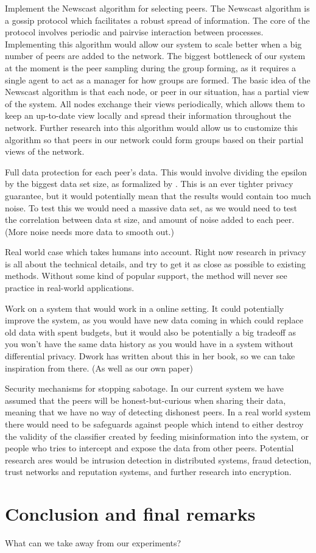 Implement the Newscast algorithm for selecting peers. The Newscast algorithm is a gossip protocol which facilitates a robust spread of information. The core of the protocol involves periodic and pairvise interaction between processes. Implementing this algorithm would allow our system to scale better when a big number of peers are added to the network. The biggest bottleneck of our system at the moment is the peer sampling during the group forming, as it requires a single agent to act as a manager for how groups are formed. The basic idea of the Newscast algorithm is that each node, or peer in our situation, has a partial view of the system. All nodes exchange their views periodically, which allows them to keep an up-to-date view locally and spread their information throughout the network. Further research into this algorithm would allow us to customize this algorithm so that peers in our network could form groups based on their partial views of the network. 

Full data protection for each peer's data. This would involve dividing the epsilon by the biggest data set size, as formalized by \cite{dwork2013algorithmic}. This is an ever tighter privacy guarantee, but it would potentially mean that the results would contain too much noise. To test this we would need a massive data set, as we would need to test the correlation between data st size, and amount of noise added to each peer. (More noise needs more data to smooth out.)

Real world case which takes humans into account. Right now research in privacy is all about the technical details, and try to get it as close as possible to existing methods. Without some kind of popular support, the method will never see practice in real-world applications. 

Work on a system that would work in a online setting. It could potentially improve the system, as you would have new data coming in which could replace old data with spent budgets, but it would also be potentially a big tradeoff as you won't have the same data history as you would have in a system without differential privacy. Dwork has written about this in her book, so we can take inspiration from there. (As well as our own paper)

Security mechanisms for stopping sabotage. In our current system we have assumed that the peers will be honest-but-curious when sharing their data, meaning that we have no way of detecting dishonest peers. In a real world system there would need to be safeguards against people which intend to either destroy the validity of the classifier created by feeding misinformation into the system, or people who tries to intercept and expose the data from other peers. Potential research ares would be intrusion detection in distributed systems, fraud detection, trust networks and reputation systems, and further research into encryption.  


\section{Conclusion and final remarks}
What can we take away from our experiments?

\newpage
\listoftodos[Notes]

\cleardoublepage